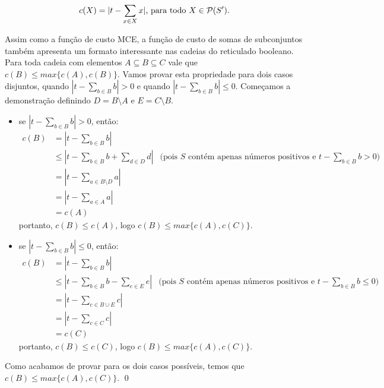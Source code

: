 \begin{equation*} \label{cost_function:subset_sum}
    c (X) = |t - \sum_{x \in X} x| \text{, para todo } 
                                        X \in \mathcal{P}(S') \text{.}
\end{equation*}

Assim como a função de custo MCE, a função de custo de somas de 
subconjuntos também apresenta um formato interessante nas cadeias
do reticulado booleano. Para toda cadeia com elementos $A \subseteq B 
\subseteq C$ vale que $c (B) \leq max\{c (A), c (B)\}$. Vamos provar 
esta propriedade para dois casos disjuntos, quando $|t - \sum_{b \in B}
b| > 0$ e quando $|t - \sum_{b \in B} b| \leq 0$. Começamos a 
demonstração definindo $D = B \setminus A$ e $E = C \setminus B$.

\begin{itemize}
    \item{se $|t - \sum_{b \in B} b| > 0$, então:}
    \begin{align*}
        c (B) & =  |t - \sum_{b \in B} b|  & \\
              & \leq  |t - \sum_{b \in B} b + \sum_{d \in D} d| & 
                \text{(pois $S$ contém apenas números positivos e $t -
                \sum_{b \in B} b > 0$)} \\
              & = |t - \sum_{a \in B \setminus D} a| \\
              & = |t - \sum_{a \in A} a| \\
              & = c (A)
    \end{align*}
    portanto, $c (B) \leq  c (A)$, logo $c (B) \leq max \{c (A), c (C)\}$.
    
    \item{se $|t - \sum_{b \in B} b| \leq 0$, então:}
    \begin{align*}
        c (B) & =  |t - \sum_{b \in B} b|  & \\
              & \leq  |t - \sum_{b \in B} b - \sum_{e \in E} e| & 
                \text{(pois $S$ contém apenas números positivos e $t -
                \sum_{b \in B} b \leq 0$)} \\
              & = |t - \sum_{c \in B \cup E} c| \\
              & = |t - \sum_{c \in C} c| \\
              & = c (C)
    \end{align*}
    portanto, $c (B) \leq  c (C)$, logo $c (B) \leq max \{c (A), c (C)\}$.
\end{itemize}
Como acabamos de provar para os dois casos possíveis, temos que 
$c (B) \leq max \{c (A), c (C)\}$. \qed

